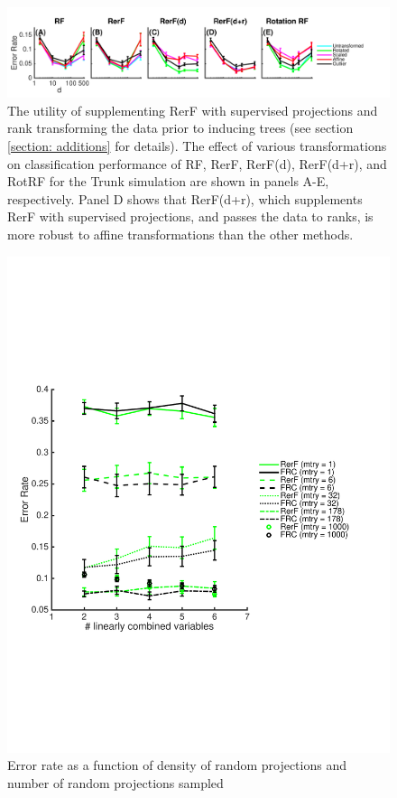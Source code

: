 \documentclass[10pt]{article}
\begin{document}
\begin{figure}[ht]
\vskip 0.2in
\begin{center}
\centerline{\includegraphics[width=\columnwidth]{../Figures/pdf/Fig5_robustness}}
\caption{The utility of supplementing RerF with supervised projections and rank transforming the data prior to inducing trees (see section \ref{section: additions} for details). The effect of various transformations on classification performance of RF, RerF, RerF(d), RerF(d+r), and RotRF for the Trunk simulation are shown in panels A-E, respectively. Panel D shows that RerF(d+r), which supplements RerF with supervised projections, and passes the data to ranks, is more robust to affine transformations than the other methods.}
\label{robustness}
\end{center}
\vskip -0.2in
\end{figure}

\begin{figure}[ht]
\vskip 0.2in
\begin{center}
\centerline{\includegraphics[width=\columnwidth]{../Figures/pdf/error_vs_sparsity}}
\caption{Error rate as a function of density of random projections and number of random projections sampled}
\label{robustness}
\end{center}
\vskip -0.2in
\end{figure}
\end{document}
